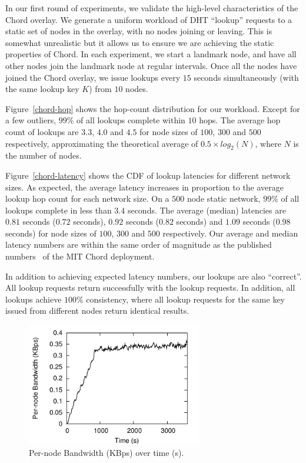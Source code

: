 {%

In our first round of experiments, we validate the high-level
characteristics of the Chord overlay. We generate a uniform workload
of DHT ``lookup'' requests to a static set of nodes in the overlay,
with no nodes joining or leaving.  This is somewhat unrealistic but it
allows us to ensure we are achieving the static properties of
Chord. In each experiment, we start a landmark node, and have all
other nodes join the landmark node at regular intervals. Once all the
nodes have joined the Chord overlay, we issue lookups every $15$
seconds simultaneously (with the same lookup key $K$) from $10$ nodes.

Figure~\ref{chord-hop} shows the hop-count distribution for our
workload.  Except for a few outliers, $99\%$ of all lookups complete
within $10$ hops. The average hop count of lookups are $3.3$, $4.0$ and
$4.5$ for node sizes of $100$, $300$ and $500$ respectively,
approximating the theoretical average of $0.5 \times log_{2}(N)$, where $N$ is
the number of nodes.  

Figure~\ref{chord-latency} shows the CDF of lookup latencies for
different network sizes.  As expected, the average latency increases in
proportion to the average lookup hop count for each network size. On a
$500$ node static network, $99\%$ of all lookups complete in less than
$3.4$ seconds. The average (median) latencies are $0.81$ seconds ($0.72$
seconds), $0.92$ seconds ($0.82$ seconds) and $1.09$ seconds ($0.98$
seconds) for node sizes of $100$, $300$ and $500$ respectively. Our
average and median latency numbers are within the same order of
magnitude as the published numbers~\cite{chord} of the MIT Chord
deployment. 

In addition to achieving expected latency numbers, our lookups are also
``correct''. All lookup requests return successfully with the lookup
requests. In addition, all lookups achieve $100\%$ consistency, where
all lookup requests for the same key issued from different nodes return
identical results.

\begin{figure}[ht]
  \begin{center}
    \includegraphics[width=3in]{graphs/overlays/bw.pdf}
    \caption{{\small Per-node Bandwidth (KBps) over time (s).}\label{chord-bw}}
  \end{center}
\end{figure}


}
